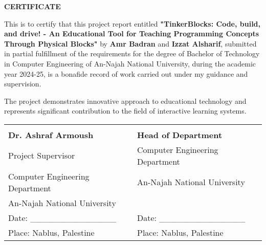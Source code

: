 \begin{center}
\Large \textbf{CERTIFICATE}
\end{center}

\vspace{2cm}

This is to certify that this project report entitled \textbf{"TinkerBlocks: Code, build, and drive! - An Educational Tool for Teaching Programming Concepts Through Physical Blocks"} by \textbf{Amr Badran} and \textbf{Izzat Alsharif}, submitted in partial fulfillment of the requirements for the degree of Bachelor of Technology in Computer Engineering of An-Najah National University, during the academic year 2024-25, is a bonafide record of work carried out under my guidance and supervision.

The project demonstrates innovative approach to educational technology and represents significant contribution to the field of interactive learning systems.

\vspace{3cm}

\begin{center}
\begin{tabular}{p{5cm} p{5cm}}
& \\[2cm]
\textbf{Dr. Ashraf Armoush} & \textbf{Head of Department} \\
Project Supervisor & Computer Engineering Department \\
Computer Engineering Department & An-Najah National University \\
An-Najah National University & \\[1cm]
Date: \_\_\_\_\_\_\_\_\_\_\_\_\_\_ & Date: \_\_\_\_\_\_\_\_\_\_\_\_\_\_ \\
Place: Nablus, Palestine & Place: Nablus, Palestine \\
\end{tabular}
\end{center}